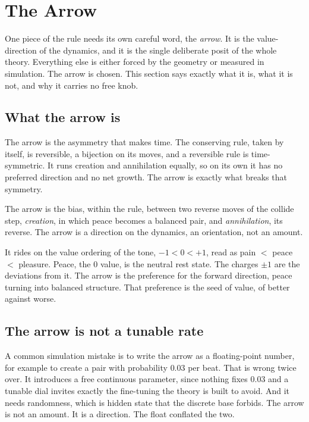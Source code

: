 \section{The Arrow}

One piece of the rule needs its own careful word, the \emph{arrow}. It is the value-direction of the dynamics,
and it is the single deliberate posit of the whole theory. Everything else is either forced by the geometry or
measured in simulation. The arrow is chosen. This section says exactly what it is, what it is not, and why it
carries no free knob.

\subsection{What the arrow is}

The arrow is the asymmetry that makes time. The conserving rule, taken by itself, is reversible, a bijection on
its moves, and a reversible rule is time-symmetric. It runs creation and annihilation equally, so on its own it
has no preferred direction and no net growth. The arrow is exactly what breaks that symmetry.

\begin{definition}
The arrow is the bias, within the rule, between two reverse moves of the collide step, \emph{creation}, in which
peace becomes a balanced pair, and \emph{annihilation}, its reverse. The arrow is a direction on the dynamics, an
orientation, not an amount.
\end{definition}

It rides on the value ordering of the tone, $-1 < 0 < +1$, read as pain $<$ peace $<$ pleasure. Peace, the $0$
value, is the neutral rest state. The charges $\pm 1$ are the deviations from it. The arrow is the preference for
the forward direction, peace turning into balanced structure. That preference is the seed of value, of better
against worse.

\subsection{The arrow is not a tunable rate}

A common simulation mistake is to write the arrow as a floating-point number, for example to create a pair with
probability $0.03$ per beat. That is wrong twice over. It introduces a free continuous parameter, since nothing
fixes $0.03$ and a tunable dial invites exactly the fine-tuning the theory is built to avoid. And it needs
randomness, which is hidden state that the discrete base forbids. The arrow is not an amount. It is a direction.
The float conflated the two.

